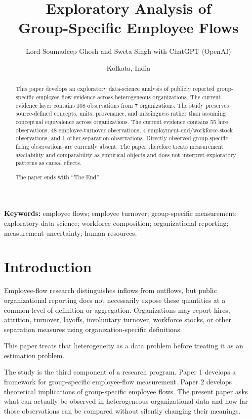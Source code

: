 \documentclass[a4paper,10pt]{article}
\title{\textbf{Exploratory Analysis of\\Group-Specific Employee Flows}}
\author{Lord Soumadeep Ghosh and Sweta Singh with ChatGPT (OpenAI)}
\date{Kolkata, India}
\begin{document}
\maketitle

\begin{abstract}
This paper develops an exploratory data-science analysis of publicly reported group-specific employee-flow evidence across heterogeneous organizations. The current evidence layer contains 108 observations from 7 organizations. The study preserves source-defined concepts, units, provenance, and missingness rather than assuming conceptual equivalence across organizations. The current evidence contains 55 hire observations, 48 employee-turnover observations, 4 employment-end/workforce-stock observations, and 1 other-separation observations. Directly observed group-specific firing observations are currently absent. The paper therefore treats measurement availability and comparability as empirical objects and does not interpret exploratory patterns as causal effects.

The paper ends with ``The End''
\end{abstract}

\noindent\textbf{Keywords:} employee flows; employee turnover; group-specific measurement; exploratory data science; workforce composition; organizational reporting; measurement uncertainty; human resources.

\section{Introduction}

Employee-flow research distinguishes inflows from outflows, but public organizational reporting does not necessarily expose these quantities at a common level of definition or aggregation. Organizations may report hires, attrition, turnover, layoffs, involuntary turnover, workforce stocks, or other separation measures using organization-specific definitions.

This paper treats that heterogeneity as a data problem before treating it as an estimation problem.

The study is the third component of a research program. Paper 1 develops a framework for group-specific employee-flow measurement. Paper 2 develops theoretical implications of group-specific employee flows. The present paper asks what can actually be observed in heterogeneous organizational data and how far those observations can be compared without silently changing their meanings.
\end{document}
